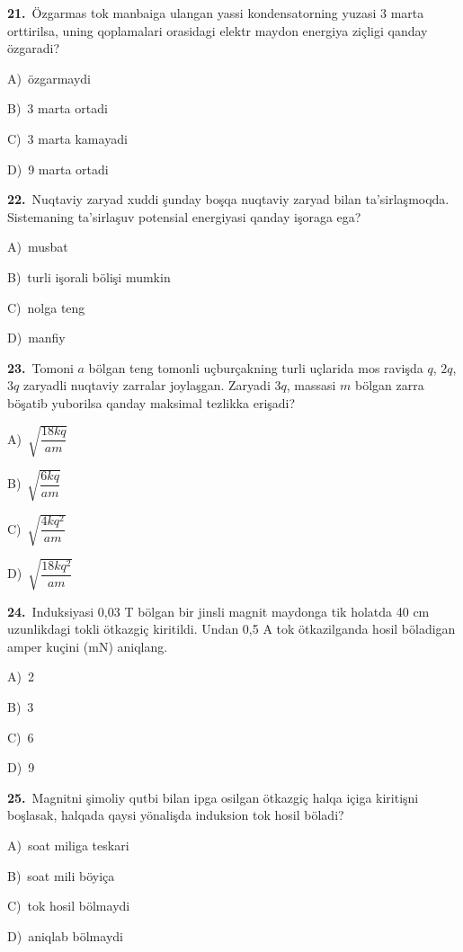 \documentclass[11pt,a4paper]{article}
\newcommand{\opt}[2]{\hspace*{4mm}#1)\ #2\par}
\begin{document}
\noindent\begin{minipage}{\linewidth}
\textbf{21.}\ Özgarmas tok manbaiga ulangan yassi kondensatorning yuzasi 3 marta orttirilsa, uning qoplamalari orasidagi elektr maydon energiya ziçligi qanday özgaradi?\par\smallskip
\opt{A}{özgarmaydi}
\opt{B}{3 marta ortadi}
\opt{C}{3 marta kamayadi}
\opt{D}{9 marta ortadi}
\end{minipage}\vspace{9pt}\par
\noindent\begin{minipage}{\linewidth}
\textbf{22.}\ Nuqtaviy zaryad xuddi şunday boşqa nuqtaviy zaryad bilan ta’sirlaşmoqda. Sistemaning ta’sirlaşuv potensial energiyasi qanday işoraga ega?\par\smallskip
\opt{A}{musbat}
\opt{B}{turli işorali bölişi mumkin}
\opt{C}{nolga teng}
\opt{D}{manfiy}
\end{minipage}\vspace{9pt}\par
\noindent\begin{minipage}{\linewidth}
\textbf{23.}\ Tomoni $a$ bölgan teng tomonli uçburçakning turli uçlarida mos ravişda $q$, $2q$, $3q$ zaryadli nuqtaviy zarralar joylaşgan. Zaryadi $3q$, massasi $m$ bölgan zarra böşatib yuborilsa qanday maksimal tezlikka erişadi?\par\smallskip
\opt{A}{$\sqrt{\dfrac{18kq}{am}}$}
\opt{B}{$\sqrt{\dfrac{6kq}{am}}$}
\opt{C}{$\sqrt{\dfrac{4kq^2}{am}}$}
\opt{D}{$\sqrt{\dfrac{18kq^2}{am}}$}
\end{minipage}\vspace{9pt}\par
\noindent\begin{minipage}{\linewidth}
\textbf{24.}\ Induksiyasi 0,03 T bölgan bir jinsli magnit maydonga tik holatda 40 cm uzunlikdagi tokli ötkazgiç kiritildi. Undan 0,5 A tok ötkazilganda hosil böladigan amper kuçini (mN) aniqlang.\par\smallskip
\opt{A}{2}
\opt{B}{3}
\opt{C}{6}
\opt{D}{9}
\end{minipage}\vspace{9pt}\par
\noindent\begin{minipage}{\linewidth}
\textbf{25.}\ Magnitni şimoliy qutbi bilan ipga osilgan ötkazgiç halqa içiga kiritişni boşlasak, halqada qaysi yönalişda induksion tok hosil böladi?\par\smallskip
\opt{A}{soat miliga teskari}
\opt{B}{soat mili böyiça}
\opt{C}{tok hosil bölmaydi}
\opt{D}{aniqlab bölmaydi}
\end{minipage}\vspace{9pt}\par
\end{document}
